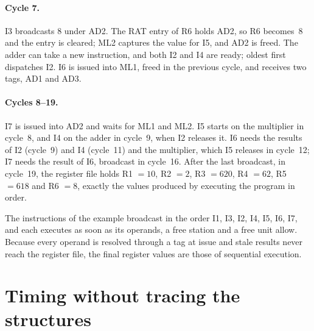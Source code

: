 \documentclass[../main.tex]{subfiles}
\begin{document}
\paragraph{Cycle 7.}  I3 broadcasts 8 under AD2.  The RAT entry of R6 holds
AD2, so R6 becomes~8 and the entry is cleared; ML2 captures the value for I5,
and AD2 is freed.  The adder can take a new instruction, and both I2 and I4
are ready; oldest first dispatches I2.  I6 is issued into ML1, freed in the
previous cycle, and receives two tags, AD1 and AD3.

\paragraph{Cycles 8--19.}  I7 is issued into AD2 and waits for ML1 and ML2.
I5 starts on the multiplier in cycle~8, and I4 on the adder in cycle~9, when I2
releases it.  I6 needs the results of I2 (cycle~9) and I4 (cycle~11) and the
multiplier, which I5 releases in cycle~12; I7 needs the result of I6,
broadcast in cycle~16.  After the last broadcast, in cycle~19, the register
file holds R1 $=10$, R2 $=2$, R3 $=620$, R4 $=62$, R5 $=618$ and R6
$=8$,
exactly the values produced by executing the program in order.

\begin{keypoint}
  The instructions of the example broadcast in the order I1, I3, I2, I4, I5,
  I6, I7, and each executes as soon as its operands, a free station and a free
  unit allow.  Because every operand is resolved through a tag at issue and
  stale results never reach the register file, the final register values are
  those of sequential execution.
\end{keypoint}

\section{Timing without tracing the structures}
\label{sec:l07-timing}
\end{document}
